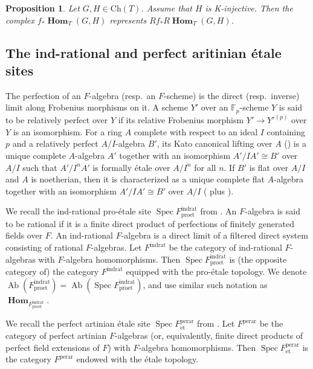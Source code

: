 \documentclass{amsart}
\newtheorem{Prop}[Thm]{Proposition}
\theoremstyle{remark}
\numberwithin{equation}{subsection}
\newcommand{\F}{\mathbb{F}}
\newcommand{\et}{\mathrm{et}}
\newcommand{\rat}{\mathrm{rat}}
\newcommand{\ind}{\mathrm{ind}}
\newcommand{\pro}{\mathrm{pro}}
\newcommand{\perar}{\mathrm{perar}}
\newcommand{\alg}[1]{\mathbf{#1}}
\newcommand{\Ch}{\mathrm{Ch}}
\DeclareMathOperator{\Spec}{Spec}
\DeclareMathOperator{\Ab}{Ab}
\DeclareMathOperator{\sheafhom}{\alg{Hom}}
\begin{document}
\begin{Prop} \label{0326}
	Let $G, H \in \Ch(T)$.
	Assume that $H$ is K-injective.
	Then the complex $f_{\ast} \sheafhom_{T}(G, H)$ represents
	$R f_{\ast} R \sheafhom_{T}(G, H)$.
\end{Prop}


\subsection{The ind-rational and perfect aritinian \'etale sites}

The perfection of an $F$-algebra (resp.\ an $F$-scheme) is
the direct (resp.\ inverse) limit along Frobenius morphisms on it.
A scheme $Y'$ over an $\F_{p}$-scheme $Y$ is said to be relatively perfect over $Y$
if its relative Frobenius morphism $Y' \to Y'^{(p)}$ over $Y$ is an isomorphism.
For a ring $A$ complete with respect to an ideal $I$ containing $p$
and a relatively perfect $A / I$-algebra $B'$,
its Kato canonical lifting over $A$ (\cite[\S 1, Definition 1]{Kat82}) is
a unique complete $A$-algebra $A'$
together with an isomorphism $A' / I A' \cong B'$ over $A / I$
such that $A' / I^{n} A'$ is formally \'etale over $A / I^{n}$ for all $n$.
If $B'$ is flat over $A / I$ and $A$ is noetherian,
then it is characterized as a unique complete flat $A$-algebra
together with an isomorphism $A' / I A' \cong B'$ over $A / I$
(\cite[\S 1, Lemma 1]{Kat82} plus \cite[Tag 0912]{Sta21}).

We recall the ind-rational pro-\'etale site $\Spec F^{\ind\rat}_{\pro\et}$ from \cite{Suz20}.
An $F$-algebra is said to be rational if it is a finite direct product of
perfections of finitely generated fields over $F$.
An ind-rational $F$-algebra is a direct limit of a filtered direct system consisting of
rational $F$-algebras.
Let $F^{\ind\rat}$ be the category of ind-rational $F$-algebras
with $F$-algebra homomorphisms.
Then $\Spec F^{\ind\rat}_{\pro\et}$ is (the opposite category of) the category $F^{\ind\rat}$
equipped with the pro-\'etale topology.
We denote $\Ab(F^{\ind\rat}_{\pro\et}) = \Ab(\Spec F^{\ind\rat}_{\pro\et})$,
and use similar such notation as $\sheafhom_{F^{\ind\rat}_{\pro\et}}$.

We recall the perfect artinian \'etale site $\Spec F^{\perar}_{\et}$
from \cite{Suz21}.
Let $F^{\perar}$ be the category of perfect artinian $F$-algebras
(or, equivalently, finite direct products of perfect field extensions of $F$)
with $F$-algebra homomorphisms.
Then $\Spec F^{\perar}_{\et}$ is the category $F^{\perar}$ endowed with the \'etale topology.
\end{document}
